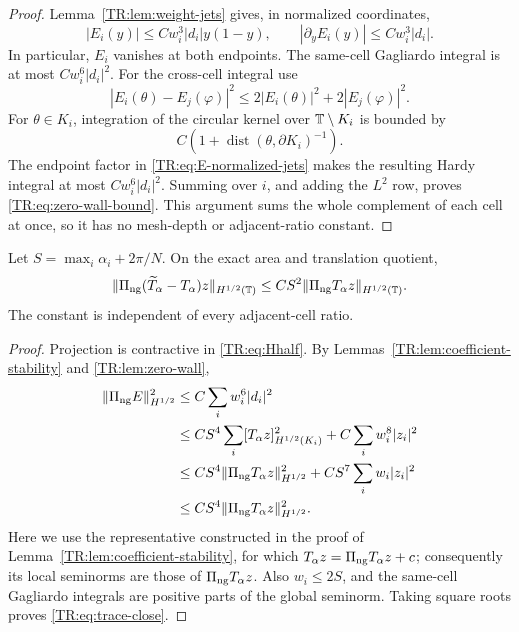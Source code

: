 \begin{proof}
Lemma~\ref{TR:lem:weight-jets} gives, in normalized coordinates,
\begin{equation}\label{TR:eq:E-normalized-jets}
 |E_i(y)|\le Cw_i^3|d_i|y(1-y),
 \qquad
 |\partial_yE_i(y)|\le Cw_i^3|d_i|.
\end{equation}
In particular, $E_i$ vanishes at both endpoints.  The same-cell
Gagliardo integral is at most $Cw_i^6|d_i|^2$.  For the cross-cell
integral use
\begin{equation*}
 |E_i(\theta)-E_j(\varphi)|^2
 \le2|E_i(\theta)|^2+2|E_j(\varphi)|^2.
\end{equation*}
For $\theta\in K_i$, integration of the circular kernel over
$\mathbb T\setminus K_i$ is bounded by
\begin{equation*}
 C\left(1+\operatorname {dist}(\theta,\partial K_i)^{-1}\right).
\end{equation*}
The endpoint factor in \eqref{TR:eq:E-normalized-jets} makes the resulting
Hardy integral at most $Cw_i^6|d_i|^2$.  Summing over $i$, and adding the
$L^2$ row, proves \eqref{TR:eq:zero-wall-bound}.  This argument sums the
whole complement of each cell at once, so it has no mesh-depth or
adjacent-ratio constant.
\end{proof}

\begin{lemma}
\label{TR:lem:trace-close}
Let $S=\max_i\alpha_i+2\pi/N$.  On the exact area and translation
quotient,
\begin{equation}\label{TR:eq:trace-close}
 \|\Pi_{\rm ng}(\widetilde T_\alpha-T_\alpha)z\|_{H^{1/2}(\mathbb T)}
 \le CS^2\|\Pi_{\rm ng} T_\alpha z\|_{H^{1/2}(\mathbb T)}.
\end{equation}
The constant is independent of every adjacent-cell ratio.
\end{lemma}

\begin{proof}
Projection is contractive in \eqref{TR:eq:Hhalf}.  By
Lemmas~\ref{TR:lem:coefficient-stability} and \ref{TR:lem:zero-wall},
\begin{align*}
 \|\Pi_{\rm ng} E\|_{H^{1/2}}^2
 &\le C\sum_iw_i^6|d_i|^2\\
 &\le CS^4\sum_i[T_\alpha z]_{H^{1/2}(K_i)}^2
   +C\sum_iw_i^8|z_i|^2\\
 &\le CS^4\|\Pi_{\rm ng} T_\alpha z\|_{H^{1/2}}^2
   +CS^7\sum_iw_i|z_i|^2\\
 &\le CS^4\|\Pi_{\rm ng} T_\alpha z\|_{H^{1/2}}^2.
\end{align*}
Here we use the representative constructed in the proof of
Lemma~\ref{TR:lem:coefficient-stability}, for which
$T_\alpha z=\Pi_{\rm ng} T_\alpha z+c$; consequently its local seminorms are
those of $\Pi_{\rm ng} T_\alpha z$.  Also $w_i\le2S$, and the same-cell
Gagliardo integrals are positive parts of the global seminorm.  Taking square roots proves
\eqref{TR:eq:trace-close}.
\end{proof}

